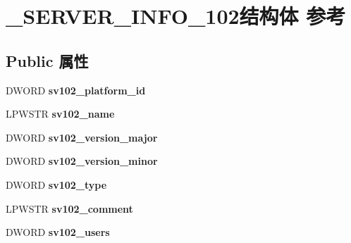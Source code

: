 \hypertarget{struct___s_e_r_v_e_r___i_n_f_o__102}{}\section{\+\_\+\+S\+E\+R\+V\+E\+R\+\_\+\+I\+N\+F\+O\+\_\+102结构体 参考}
\label{struct___s_e_r_v_e_r___i_n_f_o__102}
\subsection*{Public 属性}
\begin{DoxyCompactItemize}
\item 
\mbox{\label{struct___s_e_r_v_e_r___i_n_f_o__102_a72980d33a3c7234c99cf15086101a85c}} 
D\+W\+O\+RD {\bfseries sv102\+\_\+platform\+\_\+id}
\item 
\mbox{\label{struct___s_e_r_v_e_r___i_n_f_o__102_a2566ac5fec0b46bf1f99dca878c0b48f}} 
L\+P\+W\+S\+TR {\bfseries sv102\+\_\+name}
\item 
\mbox{\label{struct___s_e_r_v_e_r___i_n_f_o__102_a7c869b63ab8d73d220fddcfc9549fcf8}} 
D\+W\+O\+RD {\bfseries sv102\+\_\+version\+\_\+major}
\item 
\mbox{\label{struct___s_e_r_v_e_r___i_n_f_o__102_a849fa2a0415684818ca6e00cacf2798f}} 
D\+W\+O\+RD {\bfseries sv102\+\_\+version\+\_\+minor}
\item 
\mbox{\label{struct___s_e_r_v_e_r___i_n_f_o__102_a88af612f6eea56381b7d7399fa4960a0}} 
D\+W\+O\+RD {\bfseries sv102\+\_\+type}
\item 
\mbox{\label{struct___s_e_r_v_e_r___i_n_f_o__102_a48f2478fcb3e25e419e68bc4fe8721a8}} 
L\+P\+W\+S\+TR {\bfseries sv102\+\_\+comment}
\item 
\mbox{\label{struct___s_e_r_v_e_r___i_n_f_o__102_aaa921bae36fb449be5b62559ff059c1b}} 
D\+W\+O\+RD {\bfseries sv102\+\_\+users}
\item 
\mbox{\label{struct___s_e_r_v_e_r___i_n_f_o__102_add054c913c99b90f43ed2d9868c7b3b8}} 

\end{DoxyCompactItemize}
